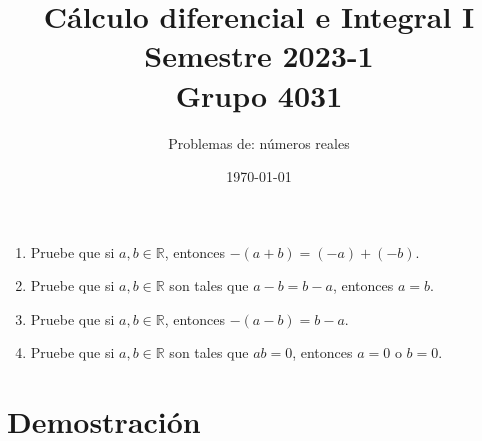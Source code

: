 \documentclass[11pt]{article}
\newcommand{\R}{\mathbb{R}}
\begin{document}
\title{\vspace{-2cm}Cálculo diferencial e Integral I \\ Semestre 2023-1 \\ Grupo 4031}
\author{Problemas de: números reales \\ }
\date{\today}
\maketitle
\thispagestyle{empty}

\begin{enumerate}
 \item Pruebe que si $a,b\in \R$, entonces $-(a+b)=(-a)+(-b)$.
 \item Pruebe que si $a,b\in \R$ son tales que $a-b=b-a$, entonces $a=b$.
 \item Pruebe que si $a,b\in \R$, entonces $-(a-b)=b-a$.
 \item Pruebe que si $a,b\in \R$ son tales que $ab=0$, entonces $a=0$ o $b=0$.
\end{enumerate}

\section*{Demostración}
\end{document}
